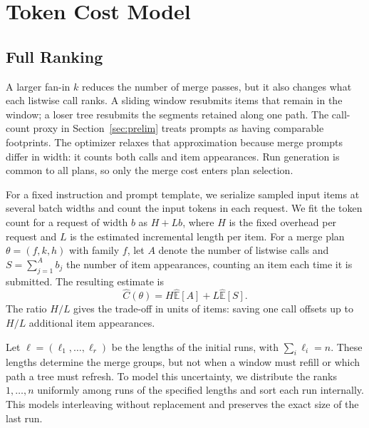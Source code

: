 \section{Token Cost Model}
\label{sec:cost}

\subsection{Full Ranking}
\label{sec:cost-full}

A larger fan-in $k$ reduces the number of merge passes, but it also changes what each listwise call ranks. A sliding window resubmits items that remain in the window; a loser tree resubmits the segments retained along one path. The call-count proxy in Section~\ref{sec:prelim} treats prompts as having comparable footprints. The optimizer relaxes that approximation because merge prompts differ in width: it counts both calls and item appearances. Run generation is common to all plans, so only the merge cost enters plan selection.

For a fixed instruction and prompt template, we serialize sampled input items at several batch widths and count the input tokens in each request. We fit the token count for a request of width $b$ as $H+Lb$, where $H$ is the fixed overhead per request and $L$ is the estimated incremental length per item. For a merge plan $\theta=(f,k,h)$ with family $f$, let $A$ denote the number of listwise calls and $S=\sum_{j=1}^{A}b_j$ the number of item appearances, counting an item each time it is submitted. The resulting estimate is
\begin{equation}
  \widehat C(\theta)=H\widehat{\mathbb E}[A]+L\widehat{\mathbb E}[S].
  \label{eq:merge-cost-model}
\end{equation}
The ratio $H/L$ gives the trade-off in units of items: saving one call offsets up to $H/L$ additional item appearances.

Let $\boldsymbol{\ell}=(\ell_1,\ldots,\ell_r)$ be the lengths of the initial runs, with $\sum_i\ell_i=n$. These lengths determine the merge groups, but not when a window must refill or which path a tree must refresh. To model this uncertainty, we distribute the ranks $1,\ldots,n$ uniformly among runs of the specified lengths and sort each run internally. This models interleaving without replacement and preserves the exact size of the last run.

